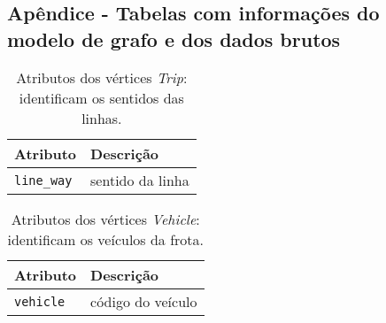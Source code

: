 
\chapter{}\label{cap:apendicea}


\section{Apêndice - Tabelas com informações do modelo de grafo e dos dados brutos}\label{sec:secaoapendicea}

\begin{table}[htb]
    \caption{Atributos dos vértices \emph{Trip}: identificam os sentidos das linhas.}
    \label{tab:vertice_trip}
    \centering
    \footnotesize
    \begin{tabular}{p{2.5cm}p{2.5cm}}
        \hline
        Atributo & Descrição\\
        \hline
        \texttt{line\_way} & sentido da linha \\
        \hline  
    \end{tabular}
\end{table}


\begin{table}[htb]
    \caption{Atributos dos vértices \emph{Vehicle}: identificam os veículos da frota.}
    \label{tab:vertice_vehicle}
    \centering
    \footnotesize
    \begin{tabular}{p{2.5cm}p{2.5cm}} 
        \hline
        Atributo & Descrição\\
        \hline
        \texttt{vehicle} & código do veículo \\
        \hline  
    \end{tabular}
\end{table}

